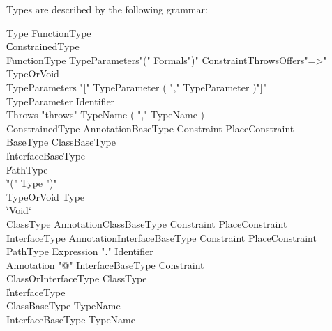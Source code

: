 Types are described by the following grammar: \\
\begin{grammar}
Type \: FunctionType \\
    \| ConstrainedType  \\

FunctionType \: TypeParameters\opt \xcd"(" Formals\opt \xcd")"
Constraint\opt Throws\opt Offers\opt \xcd"=>" TypeOrVoid \\
TypeParameters \: \xcd"[" TypeParameter ( \xcd"," TypeParameter )\star \xcd"]" \\
TypeParameter \: Identifier \\
Throws \: \xcd"throws" TypeName ( \xcd"," TypeName )\star \\

ConstrainedType \: Annotation\star BaseType Constraint\opt
PlaceConstraint\opt \\

BaseType \: ClassBaseType \\
     \| InterfaceBaseType \\
     \| PathType \\
     \| \xcd"(" Type \xcd")" \\
TypeOrVoid \: Type \\
     \| \xcd`Void`\\
ClassType \: Annotation\star ClassBaseType Constraint\opt
PlaceConstraint\opt \\
InterfaceType \: Annotation\star InterfaceBaseType Constraint\opt
PlaceConstraint\opt \\

PathType \: Expression \xcd"." Identifier \\

Annotation \: \xcd"@" InterfaceBaseType Constraint\opt \\

ClassOrInterfaceType \: ClassType \\ \| InterfaceType \\
ClassBaseType \: TypeName \\
InterfaceBaseType \: TypeName \\
\end{grammar}

% 

